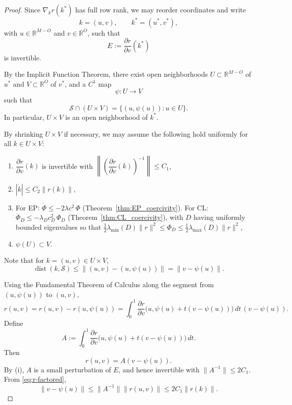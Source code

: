 \documentclass{siamart}
\begin{document}
\begin{proof}
Since $\nabla_k r(k^*)$ has full row rank, we may reorder coordinates and write
\[
k = (u,v), \qquad k^* = (u^*, v^*),
\]
with $u \in \mathbb{R}^{M-O}$ and $v \in \mathbb{R}^{O}$, such that
\[
E := \frac{\partial r}{\partial v}(k^*)
\]
is invertible.

By the Implicit Function Theorem, there exist open neighborhoods $U \subset \mathbb{R}^{M-O}$ of $u^*$ and $V \subset \mathbb{R}^{O}$ of $v^*$, and a $C^1$ map
\[
\psi : U \to V
\]
such that
\[
\mathcal{S} \cap (U \times V) = \{ (u, \psi(u)) : u \in U \}.
\]
In particular, $U \times V$ is an open neighborhood of $k^*$.

By shrinking $U \times V$ if necessary, we may assume the following hold uniformly for all $k \in U \times V$:
\begin{enumerate}
    \item[(i)] $\dfrac{\partial r}{\partial v}(k)$ is invertible with $\left\|\left(\dfrac{\partial r}{\partial v}(k)\right)^{-1}\right\| \le C_1$,
    \item[(ii)] $|\dot{k}| \le C_2 \|r(k)\|$,
    \item[(iii)] For EP: $\dot{\Phi} \leq -2\lambda c^2\,\Phi$ (Theorem~\ref{thm:EP_coercivity}). For CL: $\dot{\Phi}_D \leq -\lambda_D c_D^2\,\Phi_D$ (Theorem~\ref{thm:CL_coercivity}), with $D$ having uniformly bounded eigenvalues so that $\tfrac{1}{2}\lambda_{\min}(D)\|r\|^2 \leq \Phi_D \leq \tfrac{1}{2}\lambda_{\max}(D)\|r\|^2$,
    \item[(iv)] $\psi(U) \subset V$.
\end{enumerate}


Note that for $k = (u,v) \in U \times V$,
\begin{equation}
\operatorname{dist}(k,\mathcal S)
\le \|(u,v)-(u,\psi(u))\|
= \|v-\psi(u)\|.
\label{eq:dist-bound-v}
\end{equation}

Using the Fundamental Theorem of Calculus along the segment from $(u,\psi(u))$ to $(u,v)$,
\[
r(u,v)=r(u,v) - r(u,\psi(u))
= 
\int_0^1
\frac{\partial r}{\partial v}\big(u, \psi(u) + t(v-\psi(u))\big)\, dt \,(v-\psi(u)).
\]
Define
\[
A :=
\int_0^1
\frac{\partial r}{\partial v}\big(u, \psi(u) + t(v-\psi(u))\big)\, dt.
\]
Then
\begin{equation}
r(u,v) = A (v-\psi(u)).
\label{eq:r-factored}
\end{equation}
By (i), $A$ is a small perturbation of $E$, and hence invertible with $\|A^{-1}\| \le 2C_1$. From \eqref{eq:r-factored},
\[
\|v-\psi(u)\| \le \|A^{-1}\| \|r(u,v)\| \le 2C_1 \|r(k)\|.
\]


\end{proof}
\end{document}
